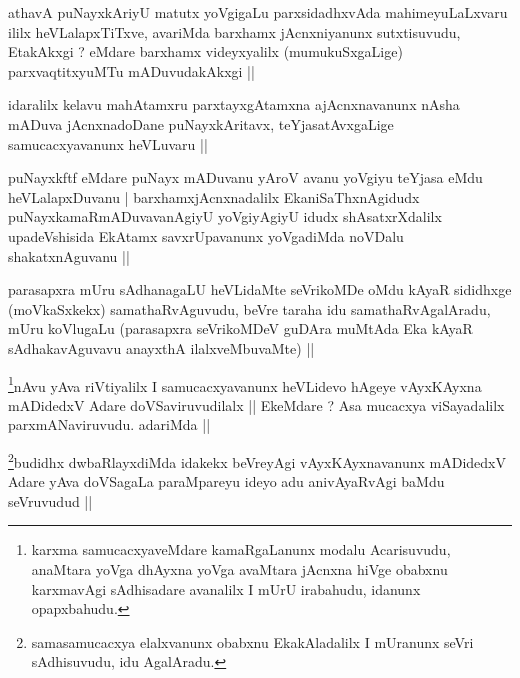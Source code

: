 \begin{artha}
athavA puNayxkAriyU matutx yoVgigaLu parxsidadhxvAda mahimeyuLaLxvaru
ililx heVLalapxTiTxve, avariMda barxhamx jAcnxniyanunx sutxtisuvudu,
EtakAkxgi ? eMdare barxhamx videyxyalilx (mumukuSxgaLige)
parxvaqtitxyuMTu mADuvudakAkxgi ||
\end{artha}


\begin{artha}
idaralilx kelavu mahAtamxru parxtayxgAtamxna ajAcnxnavanunx nAsha
mADuva jAcnxnadoDane puNayxkAritavx, teYjasatAvxgaLige
samucacxyavanunx heVLuvaru ||
\end{artha}


\begin{artha}
puNayxkftf eMdare puNayx mADuvanu yAroV avanu yoVgiyu teYjasa eMdu
heVLalapxDuvanu | barxhamxjAcnxnadalilx EkaniSaThxnAgidudx
puNayxkamaRmADuvavanAgiyU yoVgiyAgiyU idudx shAsatxrXdalilx
upadeVshisida EkAtamx savxrUpavanunx yoVgadiMda noVDalu
shakatxnAguvanu ||
\end{artha}

\begin{artha}
parasapxra mUru sAdhanagaLU heVLidaMte seVrikoMDe oMdu kAyaR sididhxge
(moVkaSxkekx) samathaRvAguvudu, beVre taraha idu samathaRvAgalAradu,
mUru koVlugaLu (parasapxra seVrikoMDeV guDAra muMtAda Eka kAyaR
sAdhakavAguvavu anayxthA ilalxveMbuvaMte)  ||
\end{artha}


\begin{artha}
\footnote{karxma samucacxyaveMdare kamaRgaLanunx modalu Acarisuvudu,
  anaMtara yoVga dhAyxna yoVga avaMtara jAcnxna hiVge obabxnu
  karxmavAgi sAdhisadare avanalilx I mUrU irabahudu, idanunx opapxbahudu.}nAvu yAva riVtiyalilx I samucacxyavanunx heVLidevo hAgeye
vAyxKAyxna mADidedxV Adare doVSaviruvudilalx || EkeMdare ? Asa
mucacxya viSayadalilx parxmANaviruvudu. adariMda ||
\end{artha}


\begin{artha}
\footnote{samasamucacxya elalxvanunx obabxnu EkakAladalilx I mUranunx
  seVri sAdhisuvudu, idu AgalAradu.}budidhx dwbaRlayxdiMda idakekx beVreyAgi vAyxKAyxnavanunx
mADidedxV Adare yAva doVSagaLa paraMpareyu ideyo adu anivAyaRvAgi
baMdu seVruvudud ||
\end{artha}

